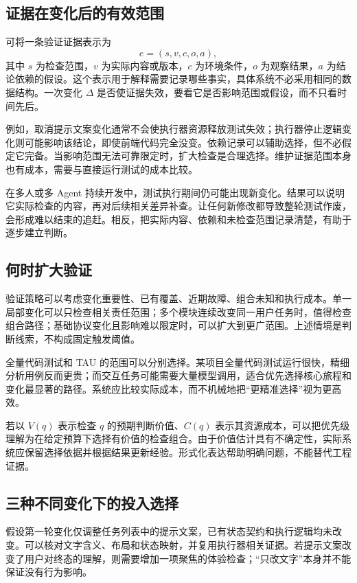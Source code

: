\subsection{证据在变化后的有效范围}
可将一条验证证据表示为
\begin{equation}
 e=(s,v,c,o,a),
\end{equation}
其中 $s$ 为检查范围，$v$ 为实际内容或版本，$c$ 为环境条件，$o$ 为观察结果，$a$ 为结论依赖的假设。这个表示用于解释需要记录哪些事实，具体系统不必采用相同的数据结构。一次变化 $\Delta$ 是否使证据失效，要看它是否影响范围或假设，而不只看时间先后。

例如，取消提示文案变化通常不会使执行器资源释放测试失效；执行器停止逻辑变化则可能影响该结论，即使前端代码完全没变。依赖记录可以辅助选择，但不必假定它完备。当影响范围无法可靠限定时，扩大检查是合理选择。维护证据范围本身也有成本，需要与直接运行测试的成本比较。


在多人或多 Agent 持续开发中，测试执行期间仍可能出现新变化。结果可以说明它实际检查的内容，再对后续相关差异补查。让任何新修改都导致整轮测试作废，会形成难以结束的追赶。相反，把实际内容、依赖和未检查范围记录清楚，有助于逐步建立判断。

\subsection{何时扩大验证}
验证策略可以考虑变化重要性、已有覆盖、近期故障、组合未知和执行成本。单一局部变化可以只检查相关责任范围；多个模块连续改变同一用户任务时，值得检查组合路径；基础协议变化且影响难以限定时，可以扩大到更广范围。上述情境是判断线索，不构成固定触发阈值。

全量代码测试和 TAU 的范围可以分别选择。某项目全量代码测试运行很快，精细分析用例反而更贵；而交互任务可能需要大量模型调用，适合优先选择核心旅程和变化最显著的路径。系统应比较实际成本，而不机械地把“更精准选择”视为更高效。

若以 $V(q)$ 表示检查 $q$ 的预期判断价值、$C(q)$ 表示其资源成本，可以把优先级理解为在给定预算下选择有价值的检查组合。由于价值估计具有不确定性，实际系统应保留选择依据并根据结果更新经验。形式化表达帮助明确问题，不能替代工程证据。


\subsection{三种不同变化下的投入选择}
假设第一轮变化仅调整任务列表中的提示文案，已有状态契约和执行逻辑均未改变。可以核对文字含义、布局和状态映射，并复用执行器相关证据。若提示文案改变了用户对终态的理解，则需要增加一项聚焦的体验检查；“只改文字”本身并不能保证没有行为影响。

